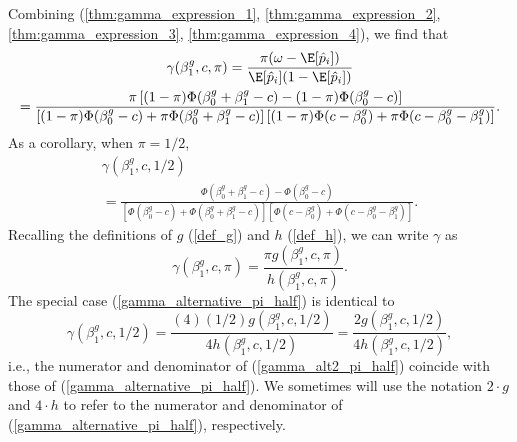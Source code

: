 \documentclass[12pt]{article}
\begin{document}
Combining (\ref{thm:gamma_expression_1}, \ref{thm:gamma_expression_2}, \ref{thm:gamma_expression_3}, \ref{thm:gamma_expression_4}), we find that
\begin{multline}\label{gamma_alternative}
\gamma(\beta^g_1, c, \pi) = \frac{\pi(\omega - \E[\hat{p}_i])}{\E[\hat{p}_i](1 - \E[\hat{p}_i])} \\ = \frac{\pi \left[(1 - \pi) \Phi(\beta_0^g + \beta_1^g - c) - (1 - \pi) \Phi(\beta_0^g - c)\right]}{\left[(1-\pi)\Phi(\beta_0^g - c) + \pi \Phi(\beta^g_0 + \beta^g_1 - c) \right] \left[(1 - \pi) \Phi(c - \beta^g_0) + \pi\Phi(c - \beta_0^g - \beta_1^g) \right]}.
\end{multline}
As a corollary, when $\pi = 1/2$,
\begin{multline}\label{gamma_alternative_pi_half}
\gamma(\beta^g_1, c, 1/2)  \\ = \frac{\Phi(\beta_0^g + \beta_1^g - c) - \Phi(\beta_0^g - c) }{\left[\Phi(\beta_0^g - c) +\Phi(\beta^g_0 + \beta^g_1 - c)\right] \left[\Phi(c - \beta^g_0) + \Phi(c - \beta_0^g - \beta_1^g) \right]}.
\end{multline}
Recalling the definitions of $g$ (\ref{def_g}) and $h$ (\ref{def_h}), we can write $\gamma$ as
$$ \gamma(\beta^g_1, c, \pi) = \frac{\pi g(\beta^g_1, c, \pi)}{h(\beta^g_1, c,\pi)}.$$
The special case (\ref{gamma_alternative_pi_half}) is identical to
\begin{equation}\label{gamma_alt2_pi_half}
\gamma(\beta^g_1, c, 1/2) = \frac{(4)(1/2)g(\beta^g_1, c, 1/2)}{4 h(\beta^g_1, c, 1/2)} = \frac{2 g(\beta^g_1, c, 1/2)}{4h(\beta^g_1, c, 1/2)},
\end{equation}
i.e., the numerator and denominator of  (\ref{gamma_alt2_pi_half}) coincide with those of (\ref{gamma_alternative_pi_half}). We sometimes will use the notation $2\cdot g$ and $4\cdot h$ to refer to the numerator and denominator of (\ref{gamma_alternative_pi_half}), respectively.
\end{document}
